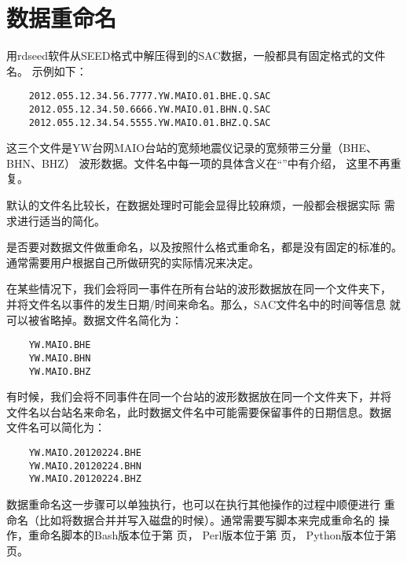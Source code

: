 \section{数据重命名}
用rdseed软件从SEED格式中解压得到的SAC数据，一般都具有固定格式的文件名。
示例如下：
\begin{verbatim}
    2012.055.12.34.56.7777.YW.MAIO.01.BHE.Q.SAC
    2012.055.12.34.50.6666.YW.MAIO.01.BHN.Q.SAC
    2012.055.12.34.54.5555.YW.MAIO.01.BHZ.Q.SAC
\end{verbatim}
这三个文件是YW台网MAIO台站的宽频地震仪记录的宽频带三分量（BHE、BHN、BHZ）
波形数据。文件名中每一项的具体含义在``''中有介绍，
这里不再重复。

默认的文件名比较长，在数据处理时可能会显得比较麻烦，一般都会根据实际
需求进行适当的简化。

是否要对数据文件做重命名，以及按照什么格式重命名，都是没有固定的标准的。
通常需要用户根据自己所做研究的实际情况来决定。

在某些情况下，我们会将同一事件在所有台站的波形数据放在同一个文件夹下，
并将文件名以事件的发生日期/时间来命名。那么，SAC文件名中的时间等信息
就可以被省略掉。数据文件名简化为：
\begin{verbatim}
    YW.MAIO.BHE
    YW.MAIO.BHN
    YW.MAIO.BHZ
\end{verbatim}

有时候，我们会将不同事件在同一个台站的波形数据放在同一个文件夹下，并将
文件名以台站名来命名，此时数据文件名中可能需要保留事件的日期信息。数据
文件名可以简化为：
\begin{verbatim}
    YW.MAIO.20120224.BHE
    YW.MAIO.20120224.BHN
    YW.MAIO.20120224.BHZ
\end{verbatim}

数据重命名这一步骤可以单独执行，也可以在执行其他操作的过程中顺便进行
重命名（比如将数据合并并写入磁盘的时候）。通常需要写脚本来完成重命名的
操作，重命名脚本的Bash版本位于第 \pageref{subsec:rename-in-bash} 页，
Perl版本位于第 \pageref{subsec:rename-in-perl} 页，
Python版本位于第 \pageref{subsec:rename-in-python} 页。
